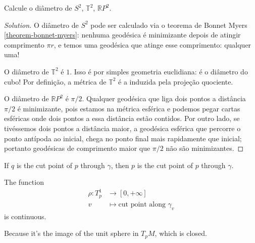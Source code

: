 \documentclass{book}
\begin{document}
\begin{exercise}
\label{exercise-diametros}
Calcule o diâmetro de $S^2$, $\mathbb{T}^2$,
$\mathbb{R}P^{2}$.
\end{exercise}

\begin{proof}[Solution]
O diâmetro de $S^2$ pode ser calculado via o
teorema de Bonnet Myers
\ref{theorem-bonnet-myers}: nenhuma geodésica
é minimizante depois de atingir
comprimento $\pi r$, e temos uma geodésica
que atinge esse comprimento: qualquer
uma!

O diâmetro de $\mathbb{T}^2$ é $1$. Isso é
por simples geometria
euclidiana: é o diâmetro do cubo! Por
definição, a métrica de  $\mathbb{T}^2$ é
a induzida pela projeção quociente.

O diâmetro de $\mathbb{R}P^{2}$ é $\pi/2$.
Qualquer geodésica que liga dois
pontos a distância $\pi/2$ é minimizante,
pois estamos na métrica esférica e
podemos pegar cartas esféricas onde dois
pontos a essa distância estão contidos.
Por outro lado, se tivéssemos dois pontos a
distância maior, a geodésica
esférica que percorre o ponto antípoda ao
inicial, chega no ponto final mais
rapidamente que inicial; portanto geodésicas
de comprimento maior que $\pi/2$
não são minimizantes.
\end{proof}

\begin{lemma}
\label{lemma-cut-point-reflexive}
If $q$ is the cut point of $p$ through
$\gamma$, then $p$ is the cut point of
$p$ through $\gamma$.
\end{lemma}

\begin{lemma}
\label{lemma-not-cut-locus-minimizing}

\end{lemma}

\begin{proposition}
The function
$$
\begin{aligned}
	\rho: T^1_p &\longrightarrow [0,+\infty] \\
	v &\longmapsto \text{cut point along
	}\gamma_v
\end{aligned}
$$
is continuous.
\end{proposition}

\begin{lemma}
\label{lemma-cut-locus-closed}
Because it's the image of the unit sphere in
$T_pM$, which is closed.
\end{lemma}

\begin{lemma}
\label{lemma-cut-locus-topology}

\end{lemma}
\end{document}
